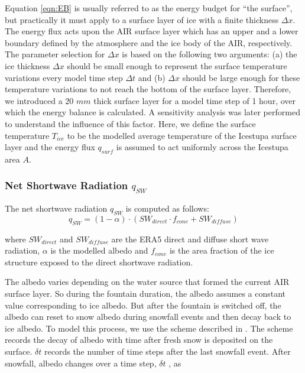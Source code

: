 \documentclass[utf8]{frontiersSCNS} %
\begin{document}
Equation \ref{eqn:EB} is usually referred to as the energy budget for “the surface”, but practically it must apply to
a surface layer of ice with a finite thickness $\Delta x$. The energy flux acts upon the AIR surface layer which
has an upper and a lower boundary defined by the atmosphere and the ice body of the AIR, respectively. The
parameter selection for $\Delta x$ is based on the following two arguments: (a) the ice thickness $\Delta x$ should be
small enough to represent the surface temperature variations every model time step $\Delta t$ and (b) $\Delta x$ should
be large enough for these temperature variations to not reach the bottom of the surface layer.  Therefore, we introduced
a 20 $mm$ thick surface layer for a model time step of 1 hour, over which the energy balance is calculated. A
sensitivity analysis was later performed to understand the influence of this factor. Here, we define the surface
temperature $T_{ice}$ to be the modelled average temperature of the Icestupa surface layer and the energy flux $q_{surf}$
is assumed to act uniformly across the Icestupa area $A$.

\subsubsection{Net Shortwave Radiation \texorpdfstring{$q_{SW}$}{Lg}}
The net shortwave radiation $q_{SW}$ is computed as follows:
\begin{equation} q_{SW} = (1- \alpha)\cdot (SW_{direct} \cdot f_{cone} + SW_{diffuse}) \label{eqn:SW} \end{equation}

where $SW_{direct}$ and $SW_{diffuse}$ are the ERA5 direct and diffuse short wave radiation, $\alpha$ is the modelled
albedo and $f_{cone}$ is the area fraction of the ice structure exposed to the direct shortwave radiation.

The albedo varies depending on the water source that formed the current AIR surface layer. So during the fountain
duration, the albedo assumes a constant value corresponding to ice albedo. But after the fountain is switched off, the
albedo can reset to snow albedo during snowfall events and then decay back to ice albedo. To model this process, we use
the scheme described in \cite{OerlemansKnap_1998}. The scheme records the decay of albedo with time after fresh snow is
deposited on the surface. $\delta t$ records the number of time steps after the last snowfall event. After snowfall,
albedo changes over a time step, $\delta t$ , as
\end{document}
